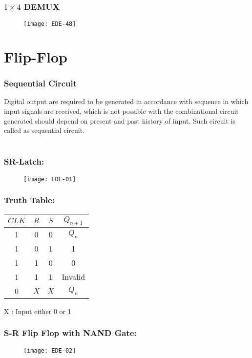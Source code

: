 \subsubsection{$1 \times 4$ DEMUX}
\begin{figure}[H]
	\centering
	\texttt{[image: EDE-48]}
\end{figure}
\section{Flip-Flop}
\subsubsection{Sequential Circuit}
Digital output are required to be generated in accordance with sequence in which input signals are received, which is not possible with the combinational circuit generated should depend on present and past history of input. Such circuit is called as sequential circuit.\\\\
	\subsubsection{SR-Latch:}
	\begin{figure}[H]
		\centering
		\texttt{[image: EDE-01]}
	\end{figure}
\subsubsection{Truth Table:}
\begin{tabular}{|c|c|c|c|}
	\hline$C L K$ & $R$ & $S$ & $Q_{n+1}$ \\
	\hline 1 & 0 & 0 & $Q_{n}$ \\
	\hline 1 & 0 & 1 & 1 \\
	\hline 1 & 1 & 0 & 0 \\
	\hline 1 & 1 & 1 & Invalid \\
	\hline 0 & $X$ & $X$ & $Q_{n}$ \\
	\hline
\end{tabular}
$\mathrm{X}$ : Input either 0 or 1
\subsubsection{ S-R Flip Flop with NAND Gate: }
\begin{figure}[H]
	\centering
	\texttt{[image: EDE-02]}
\end{figure}
